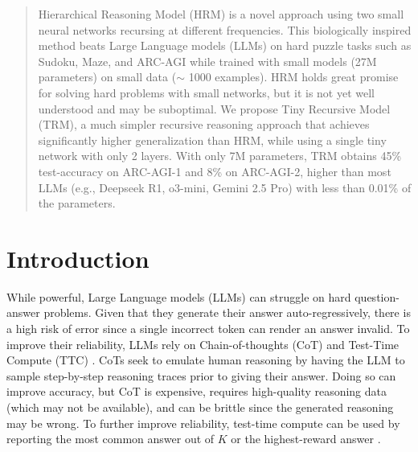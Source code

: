 \documentclass{article}
\theoremstyle{plain}
\theoremstyle{definition}
\theoremstyle{remark}
\begin{document}
\begin{abstract}

Hierarchical Reasoning Model (HRM) is a novel approach using two small neural networks recursing at different frequencies. This biologically inspired method beats Large Language models (LLMs) on hard puzzle tasks such as Sudoku, Maze, and ARC-AGI while trained with small models (27M parameters) on small data ($\sim$ 1000 examples). HRM holds great promise for solving hard problems with small networks, but it is not yet well understood and may be suboptimal. We propose Tiny Recursive Model (TRM), a much simpler recursive reasoning approach that achieves significantly higher generalization than HRM, while using a single tiny network with only 2 layers. With only 7M parameters, TRM obtains 45\% test-accuracy on ARC-AGI-1 and 8\% on ARC-AGI-2, higher than most LLMs (e.g., Deepseek R1, o3-mini, Gemini 2.5 Pro) with less than 0.01\% of the parameters.
\end{abstract}

\section{Introduction}
\label{submission}

While powerful, Large Language models (LLMs) can struggle on hard question-answer problems. Given that they generate their answer auto-regressively, there is a high risk of error since a single incorrect token can render an answer invalid. To improve their reliability, LLMs rely on Chain-of-thoughts (CoT) \citep{wei2022chain} and Test-Time Compute (TTC) \citep{snell2024scaling}. CoTs seek to emulate human reasoning by having the LLM to sample step-by-step reasoning traces prior to giving their answer. Doing so can improve accuracy, but CoT is expensive, requires high-quality reasoning data (which may not be available), and can be brittle since the generated reasoning may be wrong. To further improve reliability, test-time compute can be used by reporting the most common answer out of $K$ or the highest-reward answer \citep{snell2024scaling}. 
\end{document}
